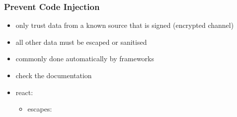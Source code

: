 \begin{frame}[fragile] \frametitle{Prevent Code Injection}
\begin{itemize}
  \item only trust data from a known source that is signed (encrypted channel)
  \item all other data must be escaped or sanitised
  \item commonly done automatically by frameworks
  \item check the documentation
  \item react:
  \begin{itemize}
    \item escapes: 
  \end{itemize}
\end{itemize}
\end{frame}
